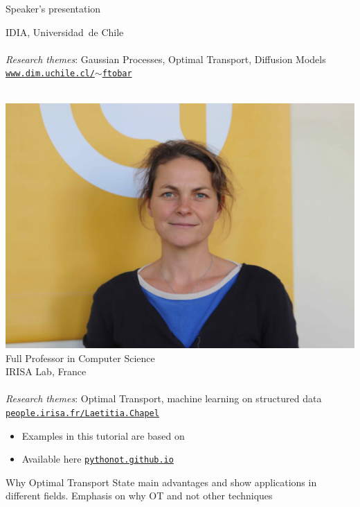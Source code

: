 \documentclass[pdf,aspectratio=169,10pt]{beamer}
\begin{document}
\begin{frame}{Speaker's presentation}
\begin{minipage}{0.45\textwidth}
IDIA, Universidad~de Chile\\
~\\
\emph{Research themes}: Gaussian Processes, Optimal Transport, Diffusion Models\\
\href{https://www.dim.uchile.cl/~ftobar/}{\texttt{www.dim.uchile.cl/$\sim$ftobar}}
\end{minipage}
\begin{minipage}{0.45\textwidth}
    \centering
    \\
\includegraphics[trim={50cm 15cm 45cm 12cm},clip,height=0.2\textheight]{../img/LC_light.jpg}\\
Full Professor in Computer Science\\
IRISA Lab, France\\
~\\
\emph{Research themes}: Optimal Transport, machine learning on structured data \\
\href{https://people.irisa.fr/Laetitia.Chapel/}{\texttt{people.irisa.fr/Laetitia.Chapel}}
\end{minipage}

\vspace{1em}
\begin{itemize}
    \item Examples in this tutorial are based on 
    \item Available here \href{https://pythonot.github.io/}{\texttt{pythonot.github.io}}
\end{itemize}
\end{frame}


\begin{frame}{Why Optimal Transport}
    State main advantages and show applications in different fields. Emphasis on why OT and not other techniques
\end{frame}
\end{document}
